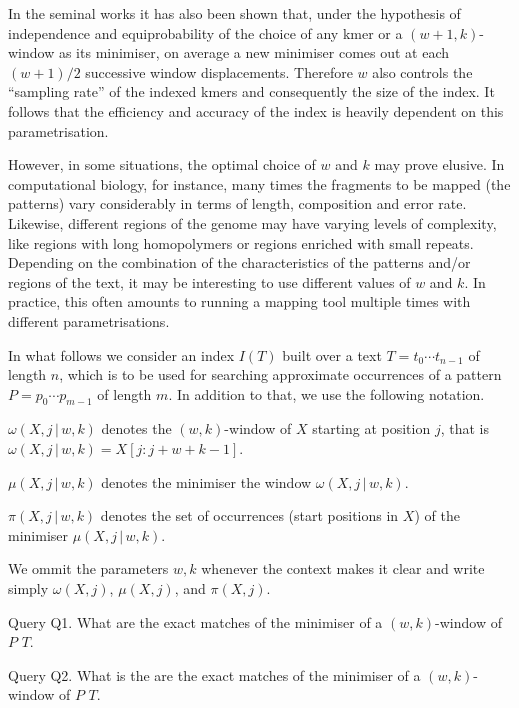 \documentclass[a4paper, 12pt, oneside]{article}
\newcommand{\wkwdw}[4]{\ensuremath{\omega(#1, #2\,|\,#3, #4)}}
\newcommand{\wkmin}[4]{\ensuremath{\mu(#1, #2\,|\,#3, #4)}}
\newcommand{\wkocc}[4]{\ensuremath{\pi(#1, #2\,|\,#3, #4)}}
\newcommand{\xwdw}[2]{\ensuremath{\omega(#1, #2)}}
\newcommand{\xmin}[2]{\ensuremath{\mu(#1, #2)}}
\newcommand{\xocc}[2]{\ensuremath{\pi(#1, #2)}}
\begin{document}
In the seminal works \cite{Schleimer2003, Roberts2004} it has also been shown that, under the hypothesis of independence and equiprobability of the choice of any kmer or a $(w+1,k)$-window as its minimiser, on average a new minimiser comes out at each $(w+1)/2$ successive window displacements. Therefore $w$ also controls the ``sampling rate'' of the indexed kmers and consequently the size of the index. It follows that the efficiency and accuracy of the index is heavily dependent on this parametrisation.

However, in some situations, the optimal choice of $w$ and $k$ may prove elusive. In computational biology, for instance, many times the fragments to be mapped (the patterns) vary considerably in terms of length, composition and error rate. Likewise, different regions of the genome may have varying levels of complexity, like regions with long homopolymers or regions enriched with small repeats. Depending on the combination of the characteristics of the patterns and/or regions of the text, it may be interesting to use different values of $w$ and $k$. In practice, this often amounts to running a mapping tool multiple times with different parametrisations.


In what follows we consider an index $I(T)$ built over a text $T=t_0\cdots t_{n-1}$ of length $n$, which is to be used for searching approximate occurrences of a pattern $P=p_0\cdots p_{m-1}$ of length $m$. In addition to that, we use the following notation.

\begin{compactitem}
\item $\wkwdw Xjwk$ denotes the $(w,k)$-window of $X$ starting at position $j$, that is $\wkwdw Xjwk=X[j:j+w+k-1]$.
\item $\wkmin Xjwk$ denotes the minimiser the window $\wkwdw Xjwk$.
\item $\wkocc Xjwk$ denotes the set of occurrences (start positions in $X$) of the minimiser $\wkmin Xjwk$.
\end{compactitem}

We ommit the parameters $w,k$ whenever the context makes it clear and write simply $\xwdw Xj$, $\xmin Xj$, and $\xocc Xj$.

Query Q1. What are the exact matches of the minimiser of a $(w,k)$-window of $P$ $T$.

Query Q2. What is the  are the exact matches of the minimiser of a $(w,k)$-window of $P$ $T$.
\end{document}
